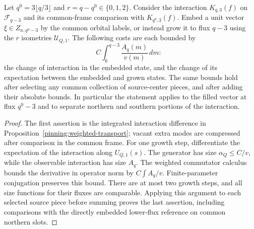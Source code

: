 \begin{corollary}
\label{pinning:calibration-cost}
Let $q^0=3\lfloor q/3\rfloor$ and $r=q-q^0\in\{0,1,2\}$.
Consider the interaction $K_{q,3}(f)$ on $\mathcal F_{q-3}$ and its
common-frame comparison with $K_{q^0,3}(f)$.  Embed a unit vector
$\xi\in Z_{n,q^0-3}$ by the common orbital labels, or instead grow it
to flux $q-3$ using the $r$ isometries $\mathcal U_{Q,1}$.  The following
costs are each bounded by
\begin{equation}
 C\int_0^{q-3}\frac{A_q(m)}{v(m)}\,dm:
 \label{eq:pinning-calibration-cost}
\end{equation}
the change of interaction in the embedded state, and the change of its
expectation between the embedded and grown states.  The same bounds
hold after selecting any common collection of source-center pieces,
and after adding their absolute bounds.  In particular the statement
applies to the filled vector at flux $q^0-3$ and to separate northern
and southern portions of the interaction.
\end{corollary}

\begin{proof}
The first assertion is the integrated interaction difference in
Proposition~\ref{pinning:weighted-transport}; vacant extra modes are
compressed after comparison in the common frame.  For one growth step,
differentiate the expectation of the interaction along $U_{Q,1}(s)$.
The generator has size $\alpha_Q\le C/v$, while the observable
interaction has size $A_q$.  The weighted commutator calculus bounds
the derivative in operator norm by $C\int A_q/v$.  Finite-parameter
conjugation preserves this bound.  There are at most two growth steps,
and all size functions for their fluxes are comparable.  Applying this
argument to each selected source piece before summing proves the last
assertion, including comparisons with the directly embedded lower-flux
reference on common northern slots.
\end{proof}
